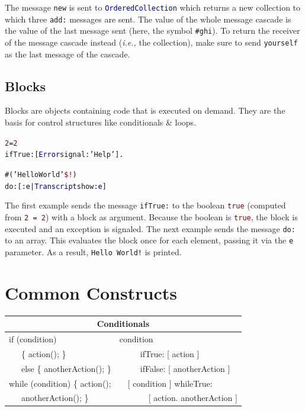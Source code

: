 \documentclass[notumble]{leaflet}
\makeatletter
\newcommand{\ie}{\emph{i.e.,}\xspace}
\newenvironment{displaycode}{%
     \par
     \hspace{1.5em}\begin{minipage}{\linewidth}
       \begin{alltt}\small}{
       \end{alltt}
     \end{minipage}
     \par}
\newcommand{\code}[1]{\foreignlanguage{english}{\texttt{#1}}}
\makeatother
\begin{document}
The message \code{new} is sent to \code{\textcolor{darkBlue}{OrderedCollection}} which
returns a new collection to which three
\code{add:} messages are sent. The value of the whole message cascade
is the value of the last message sent (here, the symbol
\textcolor{string}{\code{\#ghi}}). To return the receiver of the
message cascade instead (\ie the collection), make sure to send
\code{yourself} as the last message of the cascade.

\subsection{Blocks}
Blocks are objects containing code that is executed on demand. They are the basis for control structures like
conditionals \& loops.

\begin{displaycode}
\textcolor{darkRed}{2} = \textcolor{darkRed}{2}
  ifTrue: [ \textcolor{darkBlue}{Error} signal: \textcolor{string}{'Help'} ].
\end{displaycode}
\begin{displaycode}
\#(\textcolor{string}{'Hello World'} \textcolor{darkRed}{\$!})
  do: [ :\textcolor{darkBlue}{e} | \textcolor{darkBlue}{Transcript} show: \textcolor{darkBlue}{e} ]
\end{displaycode}

The first example sends the message \code{ifTrue:} to the boolean
\textcolor{darkRed}{\code{true}} (computed from
\code{\textcolor{darkRed}{2} = \textcolor{darkRed}{2}}) with a block
as argument. Because the boolean is \textcolor{darkRed}{\code{true}},
the block is executed and an exception is signaled. The next example
sends the message \code{do:} to an array. This evaluates the block
once for each element, passing it via the \code{e} parameter. As a
result, \code{\textcolor{string}{Hello~World!}} is printed.


\section{Common Constructs}

\noindent
\begin{tabularx}{\linewidth}{@{}lX@{}}
        \toprule
        \multicolumn{2}{c}{\textbf{Conditionals}}\\
        \midrule
        if (condition) & condition \\
      \ \ \   \{ action(); \} &   \ \ \ \ \    ifTrue: [ action ] \\
      \ \ \     else \{ anotherAction(); \}&\ \ \ \ \  ifFalse: [ anotherAction ]\\
       \midrule
      while (condition) \{ action(); &\ \  [ condition ] whileTrue:\\
      \ \ \     anotherAction(); \}&\ \ \ \ \ \ \  [ action. anotherAction ]
\end{tabularx}
\end{document}
